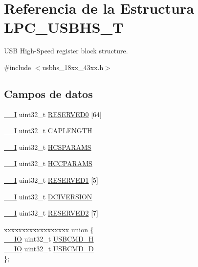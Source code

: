 \hypertarget{struct_l_p_c___u_s_b_h_s___t}{}\section{Referencia de la Estructura L\+P\+C\+\_\+\+U\+S\+B\+H\+S\+\_\+T}
\label{struct_l_p_c___u_s_b_h_s___t}


U\+SB High-\/\+Speed register block structure.  




{\ttfamily \#include $<$usbhs\+\_\+18xx\+\_\+43xx.\+h$>$}

\subsection*{Campos de datos}
\begin{DoxyCompactItemize}
\item 
\hyperlink{core__sc300_8h_af63697ed9952cc71e1225efe205f6cd3}{\+\_\+\+\_\+I} uint32\+\_\+t \hyperlink{struct_l_p_c___u_s_b_h_s___t_af58c5fd1a07d6436db757863729ffc99}{R\+E\+S\+E\+R\+V\+E\+D0} \mbox{[}64\mbox{]}
\item 
\hyperlink{core__sc300_8h_af63697ed9952cc71e1225efe205f6cd3}{\+\_\+\+\_\+I} uint32\+\_\+t \hyperlink{struct_l_p_c___u_s_b_h_s___t_af21648bd693741c08a0d9a8a7cbfda19}{C\+A\+P\+L\+E\+N\+G\+TH}
\item 
\hyperlink{core__sc300_8h_af63697ed9952cc71e1225efe205f6cd3}{\+\_\+\+\_\+I} uint32\+\_\+t \hyperlink{struct_l_p_c___u_s_b_h_s___t_ae39ae814acf9cd8199acd30e6603e6ff}{H\+C\+S\+P\+A\+R\+A\+MS}
\item 
\hyperlink{core__sc300_8h_af63697ed9952cc71e1225efe205f6cd3}{\+\_\+\+\_\+I} uint32\+\_\+t \hyperlink{struct_l_p_c___u_s_b_h_s___t_aa2d415865b92e80f9abbb893f15c0bed}{H\+C\+C\+P\+A\+R\+A\+MS}
\item 
\hyperlink{core__sc300_8h_af63697ed9952cc71e1225efe205f6cd3}{\+\_\+\+\_\+I} uint32\+\_\+t \hyperlink{struct_l_p_c___u_s_b_h_s___t_a00aaa32c956f5b42a9a5978efc85bdcd}{R\+E\+S\+E\+R\+V\+E\+D1} \mbox{[}5\mbox{]}
\item 
\hyperlink{core__sc300_8h_af63697ed9952cc71e1225efe205f6cd3}{\+\_\+\+\_\+I} uint32\+\_\+t \hyperlink{struct_l_p_c___u_s_b_h_s___t_ad5c89e60eca897d24aafc92005a7f477}{D\+C\+I\+V\+E\+R\+S\+I\+ON}
\item 
\hyperlink{core__sc300_8h_af63697ed9952cc71e1225efe205f6cd3}{\+\_\+\+\_\+I} uint32\+\_\+t \hyperlink{struct_l_p_c___u_s_b_h_s___t_a8fa48cb2c9267b161766a3a5d2591e29}{R\+E\+S\+E\+R\+V\+E\+D2} \mbox{[}7\mbox{]}
\item 
\begin{tabbing}
xx\=xx\=xx\=xx\=xx\=xx\=xx\=xx\=xx\=\kill
union \{\\
\>\hyperlink{core__sc300_8h_aec43007d9998a0a0e01faede4133d6be}{\_\_IO} uint32\_t \hyperlink{struct_l_p_c___u_s_b_h_s___t_ae6942ad74f6fe7c21f0c3cbaa6ae8ee1}{USBCMD\_H}\\
\>\hyperlink{core__sc300_8h_aec43007d9998a0a0e01faede4133d6be}{\_\_IO} uint32\_t \hyperlink{struct_l_p_c___u_s_b_h_s___t_aa717d3a3ddc444c944da23ff3ce81d84}{USBCMD\_D}\\
\}; \\


\end{tabbing}
\end{DoxyCompactItemize}

